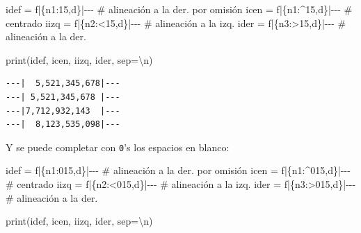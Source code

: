 \documentclass[
  spanish,
  letterpaper,
]{scrbook}
\newenvironment{Shaded}{\begin{snugshade}}{\end{snugshade}}
\newcommand{\BuiltInTok}[1]{\textcolor[rgb]{0.00,0.23,0.31}{#1}}
\newcommand{\CharTok}[1]{\textcolor[rgb]{0.13,0.47,0.30}{#1}}
\newcommand{\CommentTok}[1]{\textcolor[rgb]{0.37,0.37,0.37}{#1}}
\newcommand{\NormalTok}[1]{\textcolor[rgb]{0.00,0.23,0.31}{#1}}
\newcommand{\OperatorTok}[1]{\textcolor[rgb]{0.37,0.37,0.37}{#1}}
\newcommand{\SpecialCharTok}[1]{\textcolor[rgb]{0.37,0.37,0.37}{#1}}
\newcommand{\SpecialStringTok}[1]{\textcolor[rgb]{0.13,0.47,0.30}{#1}}
\newcommand{\StringTok}[1]{\textcolor[rgb]{0.13,0.47,0.30}{#1}}
\theoremstyle{definition}
\theoremstyle{remark}
\begin{document}
\begin{Shaded}
\begin{Highlighting}[]
\NormalTok{idef }\OperatorTok{=} \SpecialStringTok{f\textquotesingle{}{-}{-}{-}|}\SpecialCharTok{\{}\NormalTok{n1}\SpecialCharTok{:15,d\}}\SpecialStringTok{|{-}{-}{-}\textquotesingle{}}  \CommentTok{\# alineación a la der. por omisión}
\NormalTok{icen }\OperatorTok{=} \SpecialStringTok{f\textquotesingle{}{-}{-}{-}|}\SpecialCharTok{\{}\NormalTok{n1}\SpecialCharTok{:\^{}15,d\}}\SpecialStringTok{|{-}{-}{-}\textquotesingle{}} \CommentTok{\# centrado}
\NormalTok{iizq }\OperatorTok{=} \SpecialStringTok{f\textquotesingle{}{-}{-}{-}|}\SpecialCharTok{\{}\NormalTok{n2}\SpecialCharTok{:\textless{}15,d\}}\SpecialStringTok{|{-}{-}{-}\textquotesingle{}} \CommentTok{\# alineación a la izq.}
\NormalTok{ider }\OperatorTok{=} \SpecialStringTok{f\textquotesingle{}{-}{-}{-}|}\SpecialCharTok{\{}\NormalTok{n3}\SpecialCharTok{:\textgreater{}15,d\}}\SpecialStringTok{|{-}{-}{-}\textquotesingle{}} \CommentTok{\# alineación a la der.}

\BuiltInTok{print}\NormalTok{(idef, icen, iizq, ider, sep}\OperatorTok{=}\StringTok{\textquotesingle{}}\CharTok{\textbackslash{}n}\StringTok{\textquotesingle{}}\NormalTok{)}
\end{Highlighting}
\end{Shaded}

\begin{verbatim}
---|  5,521,345,678|---
---| 5,521,345,678 |---
---|7,712,932,143  |---
---|  8,123,535,098|---
\end{verbatim}

Y se puede completar con \texttt{0}'s los espacios en blanco:

\begin{Shaded}
\begin{Highlighting}[]
\NormalTok{idef }\OperatorTok{=} \SpecialStringTok{f\textquotesingle{}{-}{-}{-}|}\SpecialCharTok{\{}\NormalTok{n1}\SpecialCharTok{:015,d\}}\SpecialStringTok{|{-}{-}{-}\textquotesingle{}}  \CommentTok{\# alineación a la der. por omisión}
\NormalTok{icen }\OperatorTok{=} \SpecialStringTok{f\textquotesingle{}{-}{-}{-}|}\SpecialCharTok{\{}\NormalTok{n1}\SpecialCharTok{:\^{}015,d\}}\SpecialStringTok{|{-}{-}{-}\textquotesingle{}} \CommentTok{\# centrado}
\NormalTok{iizq }\OperatorTok{=} \SpecialStringTok{f\textquotesingle{}{-}{-}{-}|}\SpecialCharTok{\{}\NormalTok{n2}\SpecialCharTok{:\textless{}015,d\}}\SpecialStringTok{|{-}{-}{-}\textquotesingle{}} \CommentTok{\# alineación a la izq.}
\NormalTok{ider }\OperatorTok{=} \SpecialStringTok{f\textquotesingle{}{-}{-}{-}|}\SpecialCharTok{\{}\NormalTok{n3}\SpecialCharTok{:\textgreater{}015,d\}}\SpecialStringTok{|{-}{-}{-}\textquotesingle{}} \CommentTok{\# alineación a la der.}

\BuiltInTok{print}\NormalTok{(idef, icen, iizq, ider, sep}\OperatorTok{=}\StringTok{\textquotesingle{}}\CharTok{\textbackslash{}n}\StringTok{\textquotesingle{}}\NormalTok{)}
\end{Highlighting}
\end{Shaded}
\end{document}

